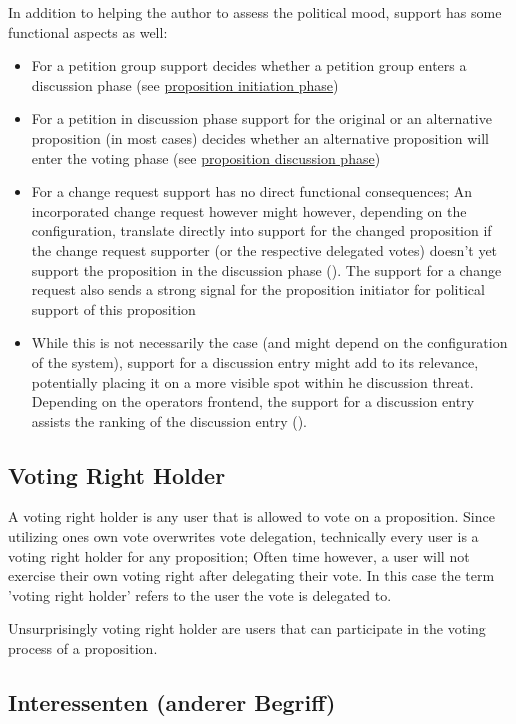 In addition to helping the author to assess the political mood, support has some functional aspects as well:
\begin{itemize}
\item For a petition group support decides whether a petition group enters a discussion phase (see \href{ssec:Lifecycle_Initiation}{proposition initiation phase})
\item For a petition in discussion phase support for the original or an alternative proposition (in most cases) decides whether an alternative proposition will enter the voting phase (see \href{ssec:Lifecycle_Discussion}{proposition discussion phase})
\item For a change request support has no direct functional consequences; An incorporated change request however might however, depending on the configuration, translate directly into support for the changed proposition if the change request supporter (or the respective delegated votes) doesn't yet support the proposition in the discussion phase (). The support for a change request also sends a strong signal for the proposition initiator for political support of this proposition
\item While this is not necessarily the case (and might depend on the configuration of the system), support for a discussion entry might add to its relevance, potentially placing it on a more visible spot within he discussion threat. Depending on the operators frontend, the support for a discussion entry assists the ranking of the discussion entry ().
\end{itemize}


\subsection{Voting Right Holder}
\label{ssec:Roles_VotingRightHolder}
A voting right holder is any user that is allowed to vote on a proposition. Since utilizing ones own vote overwrites vote delegation, technically every user is a voting right holder for any proposition; Often time however, a user will not exercise their own voting right after delegating their vote. In this case the term 'voting right holder' refers to the user the vote is delegated to. 

Unsurprisingly voting right holder are users that can participate in the voting process of a proposition.


\subsection{Interessenten (anderer Begriff)}
% 
% 
% 
\label{ssec:Roles_Interessenten}

